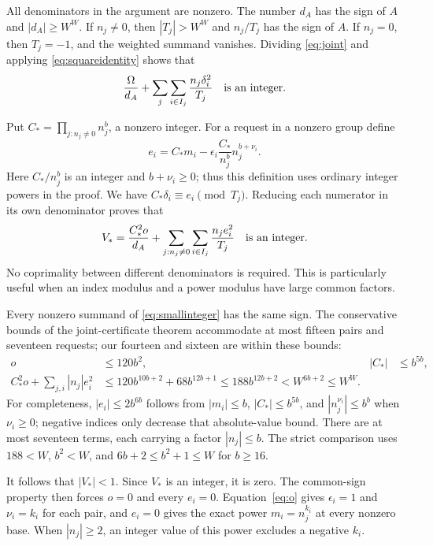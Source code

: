 \documentclass[11pt]{article}
\theoremstyle{definition}\newtheorem{definition}[theorem]{Definition}
\theoremstyle{remark}\newtheorem{remark}[theorem]{Remark}
\begin{document}
All denominators in the argument are nonzero. The number $d_A$ has the
sign of $A$ and $|d_A|\geq W^W$. If $n_j\ne0$, then
$|T_j|>W^W$ and $n_j/T_j$ has the sign of $A$. If $n_j=0$, then
$T_j=-1$, and the weighted summand vanishes. Dividing
\eqref{eq:joint} and applying \eqref{eq:squareidentity} shows that
\[
 \frac{\Omega}{d_A}+\sum_j\sum_{i\in I_j}
                 \frac{n_j\delta_i^2}{T_j}
\quad\hbox{is an integer.}
\]

Put $C_* =\prod_{j:n_j\ne0}n_j^b$, a nonzero integer. For a request in
a nonzero group define
\[
 e_i=C_*m_i-\epsilon_i\frac{C_*}{n_j^b}n_j^{b+\nu_i}.
\]
Here $C_*/n_j^b$ is an integer and $b+\nu_i\geq0$; thus this
definition uses ordinary integer powers in the proof. We have
$C_*\delta_i\equiv e_i\pmod{T_j}$. Reducing each numerator in its
own denominator proves that
\begin{equation}
 V_*=\frac{C_*^2o}{d_A}+
       \sum_{j:n_j\ne0}\sum_{i\in I_j}\frac{n_je_i^2}{T_j}
 \quad\hbox{is an integer.}
 \label{eq:smallinteger}
\end{equation}
No coprimality between different denominators is required. This is
particularly useful when an index modulus and a power modulus have
large common factors.

Every nonzero summand of \eqref{eq:smallinteger} has the same sign.
The conservative bounds of the joint-certificate theorem accommodate
at most fifteen pairs and seventeen requests; our fourteen and sixteen
are within these bounds:
\begin{align*}
 o&\leq120b^2,& |C_*|&\leq b^{5b},\\
 C_*^2o+\sum_{j,i}|n_j|e_i^2
   &\leq120b^{10b+2}+68b^{12b+1}
     \leq188b^{12b+2}<W^{6b+2}\leq W^W.
\end{align*}
For completeness, $|e_i|\leq2b^{6b}$ follows from $|m_i|\leq b$,
$|C_*|\leq b^{5b}$, and $|n_j^{\nu_i}|\leq b^b$ when
$\nu_i\geq0$; negative indices only decrease that absolute-value
bound. There are at most seventeen terms, each carrying a factor
$|n_j|\leq b$. The strict comparison uses $188<W$, $b^2<W$, and
$6b+2\leq b^2+1\leq W$ for $b\geq16$.

It follows that $|V_*|<1$. Since $V_*$ is an integer, it is zero.
The common-sign property then forces $o=0$ and every $e_i=0$.
Equation~\eqref{eq:o} gives $\epsilon_i=1$ and $\nu_i=k_i$ for
each pair, and $e_i=0$ gives the exact power $m_i=n_j^{k_i}$ at every
nonzero base. When $|n_j|\geq2$, an integer value of this power
excludes a negative $k_i$.
\end{document}
